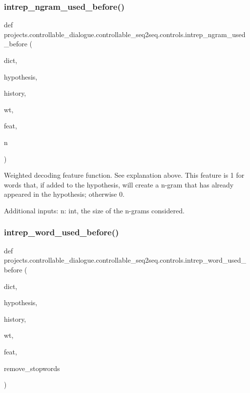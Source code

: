 \subsubsection{\texorpdfstring{intrep\+\_\+ngram\+\_\+used\+\_\+before()}{intrep\_ngram\_used\_before()}}
{\footnotesize\ttfamily def projects.\+controllable\+\_\+dialogue.\+controllable\+\_\+seq2seq.\+controls.\+intrep\+\_\+ngram\+\_\+used\+\_\+before (\begin{DoxyParamCaption}\item[{}]{dict,  }\item[{}]{hypothesis,  }\item[{}]{history,  }\item[{}]{wt,  }\item[{}]{feat,  }\item[{}]{n }\end{DoxyParamCaption})}

\begin{DoxyVerb}Weighted decoding feature function. See explanation above. This feature is 1 for
words that, if added to the hypothesis, will create a n-gram that has already
appeared in the hypothesis; otherwise 0.

Additional inputs:
  n: int, the size of the n-grams considered.
\end{DoxyVerb}
 \mbox{\label{namespaceprojects_1_1controllable__dialogue_1_1controllable__seq2seq_1_1controls_a42b08e3d8604f6e0b7d88230323cd777}} 
\subsubsection{\texorpdfstring{intrep\+\_\+word\+\_\+used\+\_\+before()}{intrep\_word\_used\_before()}}
{\footnotesize\ttfamily def projects.\+controllable\+\_\+dialogue.\+controllable\+\_\+seq2seq.\+controls.\+intrep\+\_\+word\+\_\+used\+\_\+before (\begin{DoxyParamCaption}\item[{}]{dict,  }\item[{}]{hypothesis,  }\item[{}]{history,  }\item[{}]{wt,  }\item[{}]{feat,  }\item[{}]{remove\+\_\+stopwords }\end{DoxyParamCaption})}

